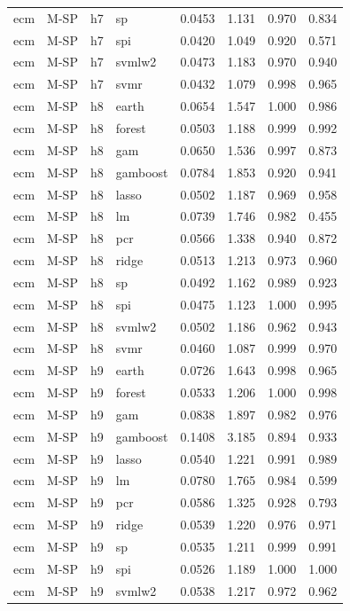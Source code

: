 \begin{ThreePartTable}
\begin{longtable}[t]{llclcccc}
ecm & M-SP & h7 & sp & 0.0453 & 1.131 & 0.970 & 0.834\\
ecm & M-SP & h7 & spi & 0.0420 & 1.049 & 0.920 & 0.571\\
ecm & M-SP & h7 & svmlw2 & 0.0473 & 1.183 & 0.970 & 0.940\\
ecm & M-SP & h7 & svmr & 0.0432 & 1.079 & 0.998 & 0.965\\
\addlinespace
ecm & M-SP & h8 & earth & 0.0654 & 1.547 & 1.000 & 0.986\\
ecm & M-SP & h8 & forest & 0.0503 & 1.188 & 0.999 & 0.992\\
ecm & M-SP & h8 & gam & 0.0650 & 1.536 & 0.997 & 0.873\\
ecm & M-SP & h8 & gamboost & 0.0784 & 1.853 & 0.920 & 0.941\\
ecm & M-SP & h8 & lasso & 0.0502 & 1.187 & 0.969 & 0.958\\
ecm & M-SP & h8 & lm & 0.0739 & 1.746 & 0.982 & 0.455\\
ecm & M-SP & h8 & pcr & 0.0566 & 1.338 & 0.940 & 0.872\\
ecm & M-SP & h8 & ridge & 0.0513 & 1.213 & 0.973 & 0.960\\
ecm & M-SP & h8 & sp & 0.0492 & 1.162 & 0.989 & 0.923\\
ecm & M-SP & h8 & spi & 0.0475 & 1.123 & 1.000 & 0.995\\
ecm & M-SP & h8 & svmlw2 & 0.0502 & 1.186 & 0.962 & 0.943\\
ecm & M-SP & h8 & svmr & 0.0460 & 1.087 & 0.999 & 0.970\\
\addlinespace
ecm & M-SP & h9 & earth & 0.0726 & 1.643 & 0.998 & 0.965\\
ecm & M-SP & h9 & forest & 0.0533 & 1.206 & 1.000 & 0.998\\
ecm & M-SP & h9 & gam & 0.0838 & 1.897 & 0.982 & 0.976\\
ecm & M-SP & h9 & gamboost & 0.1408 & 3.185 & 0.894 & 0.933\\
ecm & M-SP & h9 & lasso & 0.0540 & 1.221 & 0.991 & 0.989\\
ecm & M-SP & h9 & lm & 0.0780 & 1.765 & 0.984 & 0.599\\
ecm & M-SP & h9 & pcr & 0.0586 & 1.325 & 0.928 & 0.793\\
ecm & M-SP & h9 & ridge & 0.0539 & 1.220 & 0.976 & 0.971\\
ecm & M-SP & h9 & sp & 0.0535 & 1.211 & 0.999 & 0.991\\
ecm & M-SP & h9 & spi & 0.0526 & 1.189 & 1.000 & 1.000\\
ecm & M-SP & h9 & svmlw2 & 0.0538 & 1.217 & 0.972 & 0.962\\

\end{longtable}
\end{ThreePartTable}
